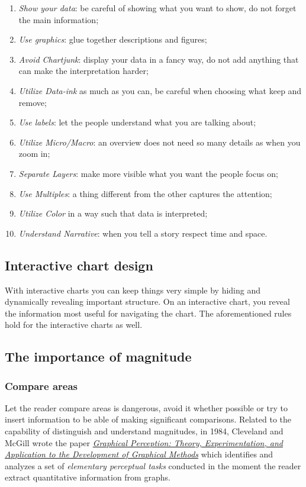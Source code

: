 \begin{enumerate}
\item \emph{Show your data}: be careful of showing what you want to show, do not forget the main information;
\item \emph{Use graphics}: glue together descriptions and figures;
\item \emph{Avoid Chartjunk}: display your data in a fancy way, do not add anything that can make the interpretation harder;
\item \emph{Utilize Data-ink} as much as you can, be careful when choosing what keep and remove;
\item \emph{Use labels}: let the people understand what you are talking about;
\item \emph{Utilize Micro/Macro}: an overview does not need so many details as when you zoom in;
\item \emph{Separate Layers}: make more visible what you want the people focus on;
\item \emph{Use Multiples}: a thing different from the other captures the attention;
\item \emph{Utilize Color} in a way such that data is interpreted;
\item \emph{Understand Narrative}: when you tell a story respect time and space.
\end{enumerate}

\subsection*{Interactive chart design}

With interactive charts you can keep things very simple by hiding and dynamically revealing important structure.
On an interactive chart, you reveal the information most useful for navigating the chart. The aforementioned rules hold for the interactive charts as well.

\subsection*{The importance of magnitude}


\subsubsection*{Compare areas}

Let the reader compare areas is dangerous, avoid it whether possible or try to insert information to be able of making significant comparisons. Related to the capability of distinguish and understand magnitudes, in 1984, Cleveland and McGill wrote the paper
\href{https://www.cs.ubc.ca/\~tmm/courses/cpsc533c-04-spr/readings/cleveland.pdf}{\emph{Graphical Perception: Theory, Experimentation, and Application to the Development of Graphical Methods}} which identifies and analyzes a set of \emph{elementary perceptual tasks} conducted in the moment the reader extract quantitative information from graphs. 


